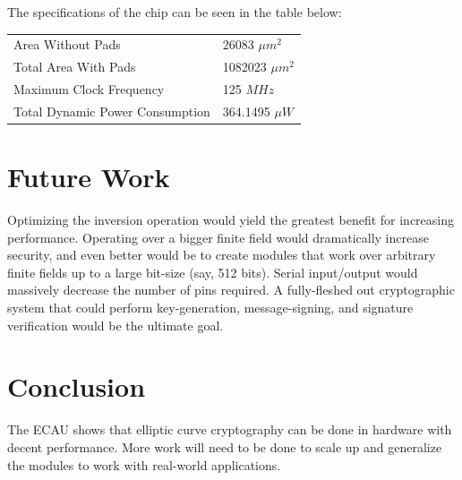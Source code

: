 \documentclass{IEEEtran}
\begin{document}
The specifications of the chip can be seen in the table below:

 \begin{tabular}{ l l }
  Area Without Pads & 26083 ${\mu}m^2$ \\
  Total Area With Pads & 1082023 ${\mu}m^2$ \\
  Maximum Clock Frequency & 125 $MHz$ \\
  Total Dynamic Power Consumption & 364.1495 ${\mu}W$\\
\end{tabular}

\section{Future Work}
Optimizing the inversion operation would yield the greatest benefit for increasing performance. Operating over a bigger finite field would dramatically increase security, and even better would be to create modules that work over arbitrary finite fields up to a large bit-size (say, 512 bits). Serial input/output would massively decrease the number of pins required. A fully-fleshed out cryptographic system that could perform key-generation, message-signing, and signature verification would be the ultimate goal.

\section{Conclusion}
The ECAU shows that elliptic curve cryptography can be done in hardware with decent performance. More work will need to be done to scale up and generalize the modules to work with real-world applications. 



\end{document}
